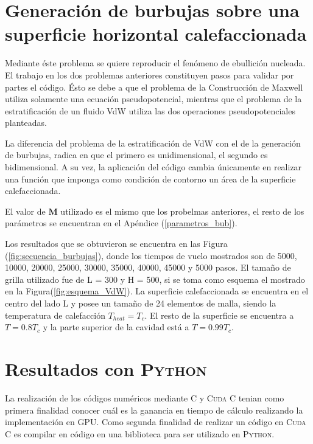 \section{Generación de burbujas sobre una superficie horizontal calefaccionada}

Mediante éste problema se quiere reproducir el fenómeno de ebullición nucleada. El trabajo en los dos problemas anteriores constituyen pasos para validar por partes el código. Ésto se debe a que el problema de la Construcción de Maxwell utiliza solamente una ecuación pseudopotencial, mientras que el problema de la estratificación de un fluido VdW utiliza las dos operaciones pseudopotenciales planteadas.

La diferencia del problema de la estratificación de VdW con el de la generación de burbujas, radica en que el primero es unidimensional, el segundo es bidimensional. A su vez, la aplicación del código cambia únicamente en realizar una función que imponga como condición de contorno un área de la superficie calefaccionada.

El valor de $\mathbf{M}$ utilizado es el mismo que los probelmas anteriores, el resto de los parámetros se encuentran en el Apéndice (\ref{parametros_bub}).

Los resultados que se obtuvieron se encuentra en las Figura (\ref{fig:secuencia_burbujas}), donde los tiempos de vuelo mostrados son de 5000, 10000, 20000, 25000, 30000, 35000, 40000, 45000 y 5000 pasos. El tamaño de grilla utilizado fue de L = 300 y H = 500, si se toma como esquema el mostrado en la Figura(\ref{fig:esquema_VdW}). La superficie calefaccionada se encuentra en el centro del lado L y posee un tamaño de 24 elementos de malla, siendo la temperatura de calefacción $T_{heat} = T_c$. El resto de la superficie se encuentra a $T = 0.8 T_c$ y la parte superior de la cavidad está a $T = 0.99 T_c$.

\newpage

\section{Resultados con \textsc{Python}}

La realización de los códigos numéricos mediante \textsc{C} y \textsc{Cuda C} tenian como primera finalidad conocer cuál es la ganancia en tiempo de cálculo realizando la implementación en GPU. Como segunda finalidad de realizar un código en \textsc{Cuda C} es compilar en código en una biblioteca para ser utilizado en \textsc{Python}.


